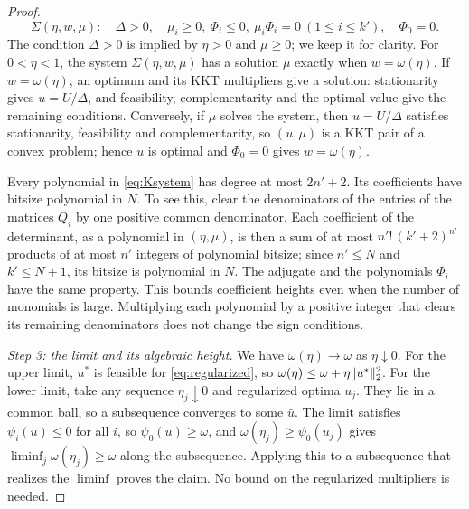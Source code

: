 \begin{proof}
\begin{equation}\label{eq:Ksystem}
 \Sigma(\eta,w,\mu):\quad
 \Delta>0,\quad
 \mu_i\ge0,\ \Phi_i\le0,\ \mu_i\Phi_i=0\ (1\le i\le k'),
 \quad \Phi_0=0.
\end{equation}
The condition $\Delta>0$ is implied by $\eta>0$ and $\mu\ge0$; we keep it
for clarity. For $0<\eta<1$, the system $\Sigma(\eta,w,\mu)$ has a
solution $\mu$ exactly when $w=\omega(\eta)$. If $w=\omega(\eta)$, an
optimum and its KKT multipliers give a solution: stationarity gives
$u=U/\Delta$, and feasibility, complementarity and the optimal value give
the remaining conditions. Conversely, if $\mu$ solves the system, then
$u=U/\Delta$ satisfies stationarity, feasibility and complementarity, so
$(u,\mu)$ is a KKT pair of a convex problem; hence $u$ is optimal and
$\Phi_0=0$ gives $w=\omega(\eta)$.

Every polynomial in \eqref{eq:Ksystem} has degree at most $2n'+2$. Its
coefficients have bitsize polynomial in $N$. To see this, clear the
denominators of the entries of the matrices $Q_i$ by one positive common
denominator. Each coefficient of the determinant, as a polynomial in
$(\eta,\mu)$, is then a sum of at most $n'!\,(k'+2)^{n'}$ products of at
most $n'$ integers of polynomial bitsize; since $n'\le N$ and $k'\le N+1$,
its bitsize is polynomial in $N$. The adjugate and the polynomials
$\Phi_i$ have the same property. This bounds coefficient heights even when
the number of monomials is large. Multiplying each polynomial by a
positive integer that clears its remaining denominators does not change
the sign conditions.

\emph{Step 3: the limit and its algebraic height.}
We have $\omega(\eta)\to\omega$ as $\eta\downarrow0$. For the upper
limit, $u^*$ is feasible for \eqref{eq:regularized}, so
$\omega(\eta)\le\omega+\eta\lVert u^*\rVert_2^2$. For the lower limit, take any
sequence $\eta_j\downarrow0$ and regularized optima $u_j$. They lie in a
common ball, so a subsequence converges to some $\bar u$. The limit
satisfies $\psi_i(\bar u)\le0$ for all $i$, so
$\psi_0(\bar u)\ge\omega$, and $\omega(\eta_j)\ge\psi_0(u_j)$ gives
$\liminf_j\omega(\eta_j)\ge\omega$ along the subsequence. Applying this to
a subsequence that realizes the $\liminf$ proves the claim. No bound on
the regularized multipliers is needed.


\end{proof}
